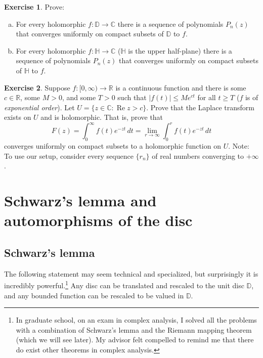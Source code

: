 \documentclass[12pt,openany]{book}
\renewcommand{\Re}{\operatorname{Re}}
\newcommand{\sabs}[1]{\lvert {#1} \rvert}
\newcommand{\C}{{\mathbb{C}}}
\newcommand{\R}{{\mathbb{R}}}
\newcommand{\D}{{\mathbb{D}}}
\newcommand{\bH}{{\mathbb{H}}}
\newcommand{\myindex}[1]{#1\index{#1}}
\theoremstyle{plain}
\theoremstyle{remark}
\theoremstyle{definition}
\newenvironment{exbox}{%
    \def\FrameCommand{\vrule width 1pt \relax\hspace{10pt}}%
    \MakeFramed{\advance\hsize-\width\FrameRestore}%
}{%
    \endMakeFramed
}
\newenvironment{exparts}{%
    \leavevmode\begin{enumerate}[a),noitemsep,topsep=0pt,parsep=0pt,partopsep=0pt]
}{%
    \end{enumerate}
}
\theoremstyle{exercise}
\newtheorem{exercise}{Exercise}[section]
\theoremstyle{example}
\begin{document}
\begin{exbox}
\begin{exercise}\label{exercise:polylimits}
\pagebreak[2]
Prove:
\begin{exparts}
\item
For every holomorphic $f \colon \D \to \C$ there
is a sequence of polynomials $P_n(z)$ that converges uniformly on compact
subsets of $\D$ to $f$.
\item
For every holomorphic $f \colon \bH \to \C$
($\bH$ is the upper half-plane) there
is a sequence of polynomials $P_n(z)$ that converges uniformly on compact
subsets of $\bH$ to $f$.
\end{exparts}
\end{exercise}

\begin{exercise}
\pagebreak[2]
Suppose $f \colon [0,\infty) \to \R$ is a continuous function and
there is some $c \in \R$, some $M > 0$, and some $T > 0$ such that 
$\sabs{f(t)} \leq M e^{ct}$ for all $t \geq T$
($f$ is of \emph{\myindex{exponential order}}).
Let $U = \{ z \in \C : \Re z > c \}$.  Prove that the Laplace transform
exists on $U$ and is holomorphic.  That is, prove that
\begin{equation*}
F(z) = \int_0^\infty f(t) e^{-zt} \, dt = \lim_{r \to \infty} \int_0^r f(t)
e^{-zt} \, dt
\end{equation*}
converges uniformly on compact subsets to a holomorphic function on $U$.
Note: To use our setup, consider every sequence $\{ r_n \}$
of real numbers converging to $+\infty$.
\end{exercise}
\end{exbox}


\section{Schwarz's lemma and automorphisms of the disc}
\label{sec:schwarz}

\subsection{Schwarz's lemma}

The following statement may
seem technical and specialized, but surprisingly it is incredibly
powerful.\footnote{In graduate school, on an exam in complex
analysis, I solved all the problems with a combination of
Schwarz's lemma and the Riemann
mapping theorem (which we will see later).
My advisor
felt compelled to remind me that there do exist other theorems in complex
analysis.}
Any disc can be translated and rescaled to the unit disc $\D$, and any
bounded function can be rescaled to be valued in $\D$.
\end{document}
